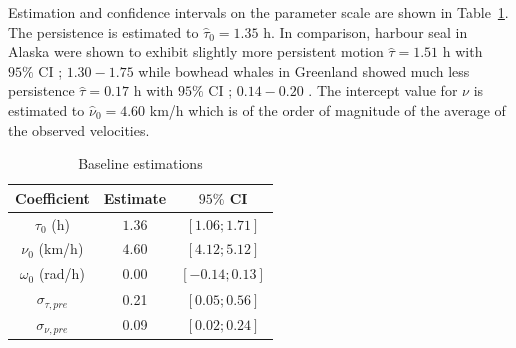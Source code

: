 \documentclass[aoas]{imsart}
\theoremstyle{definition}
\theoremstyle{remark}
\theoremstyle{remark}
\newcommand {\1}{\mathbb{1}}
\begin{document}
Estimation and confidence intervals on the parameter scale are shown in Table~\ref{table: baseline estimations}. 
The persistence is estimated to $\hat{\tau}_{0}=1.35 $ h.
In comparison, harbour seal in Alaska were shown to exhibit slightly more persistent motion $\hat{\tau}=1.51$ h with $95\%$ CI ; $1.30 -1.75$  \citep{johnson_continuous_2008} while bowhead whales in Greenland showed much less persistence $\hat{\tau}=0.17$ h with $95\%$ CI ; $0.14 -0.20$  \citep{gurarie_correlated_2017}.
The intercept value for $\nu$ is estimated to $\hat{\nu}_{0}=4.60$ km/h which is of the order of magnitude of the average of the observed velocities. 
\begin{table}[ht!]
	\centering
	\begin{tabular}{|c|c|c|}
		\hline
		Coefficient   & Estimate  & $95\%$ CI \\
		\hline
		$\tau_0$ (h)   & $1.36$    & $[1.06; 1.71]$  \\
		$\nu_0$ (km/h)  & $4.60$   &  $[4.12; 5.12]$\\
		$\omega_0$ (rad/h)    & $0.00$    &  $[-0.14; 0.13]$ \\
		$\sigma_{\tau,pre}$    & 0.21   &  $[0.05; 0.56]$ \\
		$\sigma_{\nu,pre}$    & 0.09   &  $[0.02; 0.24]$ \\
		\hline
	\end{tabular}
	\caption{Baseline estimations}
	\label{table: baseline estimations}
\end{table}
\end{document}
